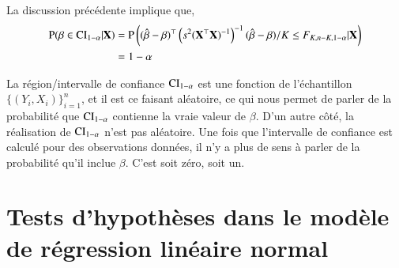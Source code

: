\documentclass[10pt, reqno]{amsart}
\begin{document}
La discussion précédente implique que,
\begin{align*}
\operatorname{P}(\beta \in \mathrm{CI}_{1-\alpha}|\mathbf X) &=\operatorname{P}\left( (\hat{\beta}-\beta)^\top\left(s^2(\mathbf X^\top\mathbf X)^{-1}\right)^{-1}(\hat{\beta}-\beta)/K \leq F_{K, n-K, 1-\alpha} | \mathbf X\right)\\
&=1-\alpha 
\end{align*}
\begin{remarque}
La région/intervalle de confiance $\mathrm{CI}_{1-\alpha}$ est une fonction de l'échantillon $\{(Y_i, X_i)\}_{i=1}^n$, et il est ce faisant aléatoire, ce qui nous permet de parler de la probabilité que $\mathrm{CI}_{1-\alpha}$ contienne la vraie valeur de $\beta$. D'un autre côté, la réalisation de $\mathrm{CI}_{1-\alpha}$ n'est pas aléatoire. Une fois que l'intervalle de confiance est calculé pour des observations données, il n'y a plus de sens à parler de la probabilité qu'il inclue $\beta$. C'est soit zéro, soit un.
\end{remarque}

\newpage

\section{Tests d'hypothèses dans le modèle de régression linéaire normal}
\end{document}
